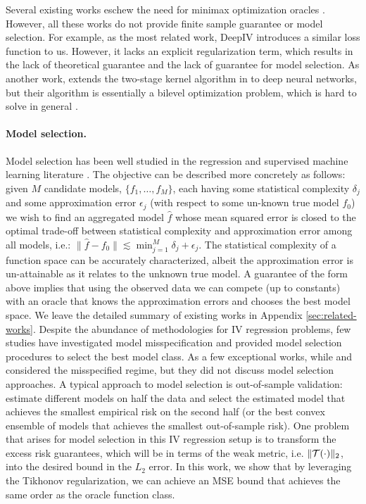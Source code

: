 Several existing works eschew the need for minimax optimization oracles \citep{hartford2017deep, xu2021deep}. However, all these works do not provide finite sample guarantee or model selection. For example, as the most related work, DeepIV \citep{hartford2017deep} introduces a similar loss function to us. However, it 
lacks an explicit regularization term, which results in the lack of theoretical guarantee and the lack of guarantee for model selection. As another work, \cite{xu2021deep} extends the two-stage kernel algorithm in \cite{singh2019kernel} to deep neural networks, but their algorithm is essentially a bilevel optimization problem, which is hard to solve in general \citep{hong2023two,khanduri2021near,guo2021randomized}. 

\paragraph{Model selection.} 

Model selection has been well studied in the regression and supervised machine
learning literature \citep{bartlett2002model,gold2003model,mcallester2003pac}. The objective can be described more concretely as follows: given $M$ candidate models, $\{f_1,\dots,f_M\}$, each having some statistical complexity $\delta_j$ and some approximation error $\epsilon_j$ (with respect to some un-known true model $f_0$) we wish to find an aggregated model $\hat{f}$ whose mean squared error is closed to the optimal trade-off between statistical complexity and approximation error among all models, i.e.:
$\|\hat{f} - f_0\| \lesssim \min_{j=1}^M \delta_j + \epsilon_j.$
The statistical complexity of a function space can be accurately characterized, albeit the approximation error is un-attainable as it relates to the unknown true model. A guarantee of the form above implies that using the observed data we can compete (up to constants) with an oracle that knows the approximation errors and chooses the best model space. We leave the detailed summary of existing works in Appendix \ref{sec:related-works}. Despite the abundance of methodologies for IV regression problems, few studies have investigated model misspecification and provided model selection procedures to select the best model class. As a few exceptional works, while \cite{xu2021deep} and \cite{AI20075} considered the misspecified regime, but they did not discuss model selection approaches. A typical approach to model selection is out-of-sample validation: estimate different models on half the data and select the estimated model that achieves the smallest empirical risk on the second half (or the best convex ensemble of models that achieves the smallest out-of-sample risk). One problem that arises for model selection in this IV regression setup is to transform the excess risk guarantees, which will be in terms of the weak metric, i.e. $\|{\mathcal{T}} (\cdot)\|_2$, into the desired bound in the $L_2$ error. In this work, we show that by leveraging the Tikhonov regularization, we can achieve an MSE bound that achieves the same order as the oracle function class. 